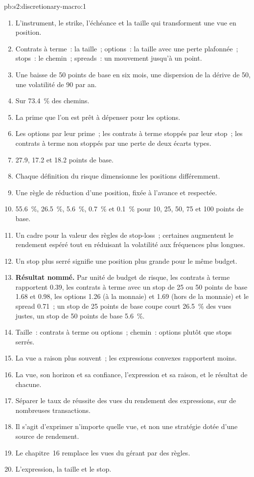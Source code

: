 \begin{solution}{pb:s2:discretionary-macro:1}
\begin{enumerate}
\item L'instrument, le strike, l'échéance et la taille qui transforment une vue en position.
\item Contrats à terme~: la taille~; options~: la taille avec une perte plafonnée~; stops~: le chemin~; spreads~: un mouvement jusqu'à un point.
\item Une baisse de 50 points de base en six mois, une dispersion de la dérive de 50, une volatilité de 90 par an.
\item Sur 73.4~\% des chemins.
\item La prime que l'on est prêt à dépenser pour les options.
\item Les options par leur prime~; les contrats à terme stoppés par leur stop~; les contrats à terme non stoppés par une perte de deux écarts types.
\item 27.9, 17.2 et 18.2 points de base.
\item Chaque définition du risque dimensionne les positions différemment.
\item Une règle de réduction d'une position, fixée à l'avance et respectée.
\item 55.6~\%, 26.5~\%, 5.6~\%, 0.7~\% et 0.1~\% pour 10, 25, 50, 75 et 100 points de base.
\item Un cadre pour la valeur des règles de stop-loss~; certaines augmentent le rendement espéré tout en réduisant la volatilité aux fréquences plus longues.
\item Un stop plus serré signifie une position plus grande pour le même budget.
\item \textbf{Résultat nommé.} Par unité de budget de risque, les contrats à terme rapportent 0.39, les contrats à terme avec un stop de 25 ou 50 points de base 1.68 et 0.98, les options 1.26 (à la
monnaie) et 1.69 (hors de la monnaie) et le spread 0.71~; un stop de 25 points de base coupe court 26.5~\% des vues justes, un stop de 50 points de base 5.6~\%.
\item Taille~: contrats à terme ou options~; chemin~: options plutôt que stops serrés.
\item La vue a raison plus souvent~; les expressions convexes rapportent moins.
\item La vue, son horizon et sa confiance, l'expression et sa raison, et le résultat de chacune.
\item Séparer le taux de réussite des vues du rendement des expressions, sur de nombreuses transactions.
\item Il s'agit d'exprimer n'importe quelle vue, et non une stratégie dotée d'une source de rendement.
\item Le chapitre~16 remplace les vues du gérant par des règles.
\item L'expression, la taille et le stop.
\end{enumerate}
\end{solution}

